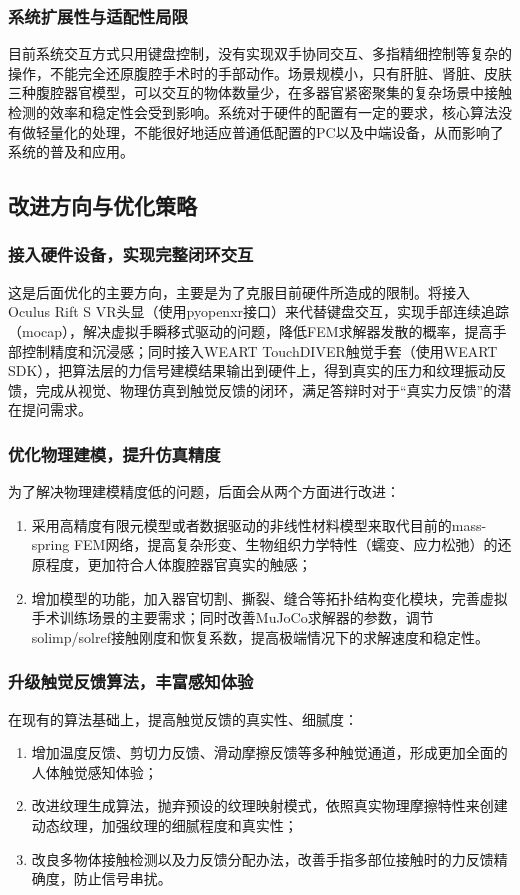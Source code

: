 \subsubsection{系统扩展性与适配性局限}
目前系统交互方式只用键盘控制，没有实现双手协同交互、多指精细控制等复杂的操作，不能完全还原腹腔手术时的手部动作。场景规模小，只有肝脏、肾脏、皮肤三种腹腔器官模型，可以交互的物体数量少，在多器官紧密聚集的复杂场景中接触检测的效率和稳定性会受到影响。系统对于硬件的配置有一定的要求，核心算法没有做轻量化的处理，不能很好地适应普通低配置的PC以及中端设备，从而影响了系统的普及和应用。

\subsection{改进方向与优化策略}

\subsubsection{接入硬件设备，实现完整闭环交互}
这是后面优化的主要方向，主要是为了克服目前硬件所造成的限制。将接入Oculus Rift S VR头显（使用pyopenxr接口）来代替键盘交互，实现手部连续追踪（mocap），解决虚拟手瞬移式驱动的问题，降低FEM求解器发散的概率，提高手部控制精度和沉浸感；同时接入WEART TouchDIVER触觉手套（使用WEART SDK），把算法层的力信号建模结果输出到硬件上，得到真实的压力和纹理振动反馈，完成从视觉、物理仿真到触觉反馈的闭环，满足答辩时对于“真实力反馈”的潜在提问需求。

\subsubsection{优化物理建模，提升仿真精度}
为了解决物理建模精度低的问题，后面会从两个方面进行改进：
\begin{enumerate}
    \item 采用高精度有限元模型或者数据驱动的非线性材料模型来取代目前的mass-spring FEM网络，提高复杂形变、生物组织力学特性（蠕变、应力松弛）的还原程度，更加符合人体腹腔器官真实的触感；
    \item 增加模型的功能，加入器官切割、撕裂、缝合等拓扑结构变化模块，完善虚拟手术训练场景的主要需求；同时改善MuJoCo求解器的参数，调节solimp/solref接触刚度和恢复系数，提高极端情况下的求解速度和稳定性。
\end{enumerate}

\subsubsection{升级触觉反馈算法，丰富感知体验}
在现有的算法基础上，提高触觉反馈的真实性、细腻度：
\begin{enumerate}
    \item 增加温度反馈、剪切力反馈、滑动摩擦反馈等多种触觉通道，形成更加全面的人体触觉感知体验；
    \item 改进纹理生成算法，抛弃预设的纹理映射模式，依照真实物理摩擦特性来创建动态纹理，加强纹理的细腻程度和真实性；
    \item 改良多物体接触检测以及力反馈分配办法，改善手指多部位接触时的力反馈精确度，防止信号串扰。
\end{enumerate}

